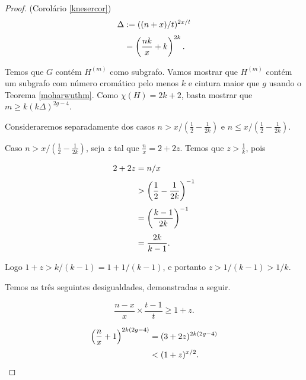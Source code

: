 \begin{proof}{(Corolário \ref{knesercor})}
\begin{equation*}
\setlength{\jot}{5pt}
\begin{aligned}
\Delta &:= ((n+x)/t)^{2x/t} \\
&= \left(\frac{nk}{x} + k\right)^{2k}.
\end{aligned}
\end{equation*}

Temos que $G$ contém $H^{(m)}$ como subgrafo. Vamos mostrar que $H^{(m)}$ contém um subgrafo com número cromático pelo menos $k$ e cintura maior que $g$ usando o Teorema \ref{moharwuthm}. Como $\chi(H) = 2k+2$, basta mostrar que $m\geq k(k\Delta)^{2g-4}$.

Consideraremos separadamente dos casos $n > x/(\frac{1}{2} - \frac{1}{2k})$ e $n \leq x/(\frac{1}{2} - \frac{1}{2k})$.

Caso $n > x/(\frac{1}{2} - \frac{1}{2k})$, seja $z$ tal que $\frac{n}{x} = 2 + 2z$. Temos que $z > \frac{1}{k}$, pois

\begin{equation*}
\setlength{\jot}{6pt}
\begin{aligned}
2+2z &= n/x \\
& > \left(\frac{1}{2} - \frac{1}{2k}\right)^{-1}\\
& = \left(\frac{k-1}{2k}\right)^{-1}\\
& = \frac{2k}{k-1}.
\end{aligned}
\end{equation*}

Logo $1+z > k/(k-1) = 1+1/(k-1)$, e portanto $z > 1/(k-1) > 1/k$.


Temos as três seguintes desigualdades, demonstradas a seguir.

\begin{equation}\label{kncase1eq1}
\frac{n-x}{x}\times \frac{t-1}{t} \geq 1+z.
\end{equation}

\begin{equation}\label{kncase1eq2}
\setlength{\jot}{5pt}
\begin{aligned}
\left(\frac{n}{x}+1\right)^{2k(2g-4)} &= (3+2z)^{2k(2g-4)}\\
&< (1+z)^{x/2}.
\end{aligned}
\end{equation}



\end{proof}
